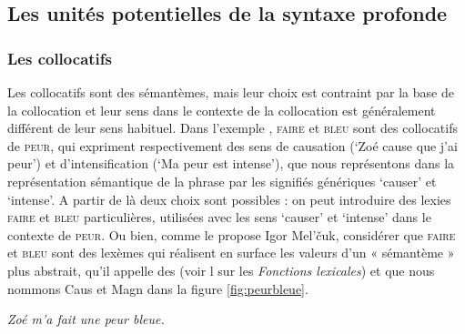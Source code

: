 \subsection{Les unités potentielles de la syntaxe profonde}\label{sec:13-potentiel}

\subsubsection{Les collocatifs}
Les collocatifs sont des sémantèmes, mais leur choix est contraint par la base de la collocation et leur sens dans le contexte de la collocation est généralement différent de leur sens habituel. Dans l’exemple , \textsc{faire} et \textsc{bleu} sont des collocatifs de \textsc{peur}, qui expriment respectivement des sens de causation (‘Zoé cause que j’ai peur’) et d’intensification (‘Ma peur est intense’), que nous représentons dans la représentation sémantique de la phrase par les signifiés génériques ‘causer’ et ‘intense’. A partir de là deux choix sont possibles : on peut introduire des lexies \textsc{faire} et \textsc{bleu} particulières, utilisées avec les sens ‘causer’ et ‘intense’ dans le contexte de \textsc{peur}. Ou bien, comme le propose Igor Mel’čuk, considérer que \textsc{faire} et \textsc{bleu} sont des lexèmes qui réalisent en surface les valeurs d’un « sémantème » plus abstrait, qu’il appelle des  (voir l sur les \textit{Fonctions lexicales}) et que nous nommons Caus et Magn dans la figure \ref{fig:peurbleue}.

\ea\label{ex:peurbleue} \textit{Zoé m’a fait une peur bleue.}\z

